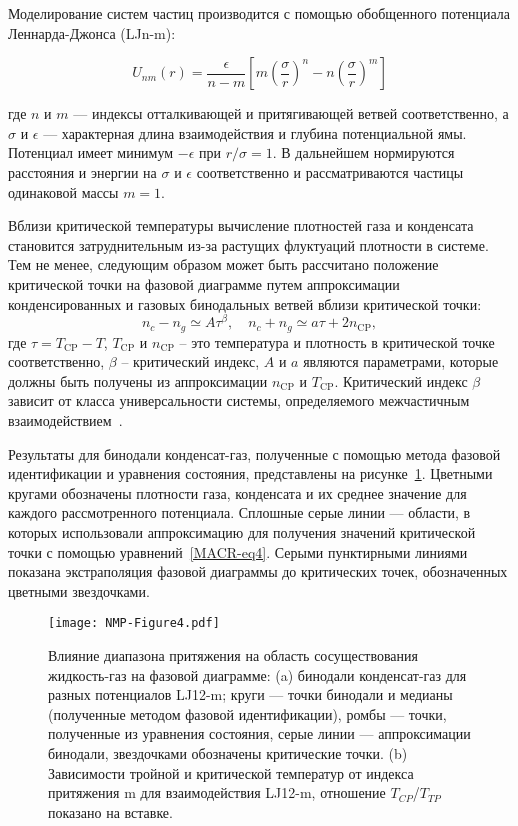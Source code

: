 Моделирование систем частиц производится с помощью обобщенного потенциала Леннарда-Джонса (LJn-m):

\begin{equation}
	U_{n m}(r)=\frac{\epsilon}{n-m}\left[m\left(\frac{\sigma}{r}\right)^{n}-n\left(\frac{\sigma}{r}\right)^{m}\right]
	\label{LJnm}
\end{equation}

где $n$ и $m$ — индексы отталкивающей и притягивающей ветвей соответственно, а $\sigma$ и $\epsilon$ — характерная длина взаимодействия и глубина потенциальной ямы.
Потенциал имеет минимум $-\epsilon$ при $r/\sigma=1$.
В дальнейшем нормируются расстояния и энергии на $\sigma$ и $\epsilon$ соответственно и рассматриваются частицы одинаковой массы $m=1$.

Вблизи критической температуры вычисление плотностей газа и конденсата становится затруднительным из-за растущих флуктуаций плотности в системе.
Тем не менее, следующим образом может быть рассчитано положение критической точки на фазовой диаграмме путем аппроксимации конденсированных и газовых бинодальных ветвей вблизи критической точки:
\begin{equation}
	n_{c}-n_{g} \simeq A \tau^{\beta}, \quad n_{c}+n_{g} \simeq a \tau+2 n_{\mathrm{CP}},
	\label{MACR-eq4}
\end{equation}
где $\tau=T_{\mathrm{CP}}-T$, $T_{\mathrm{CP}}$ и $n_{\mathrm{CP}}$ -- это температура и 
плотность в критической точке соответственно, $\beta$ -- критический индекс, $A$ и $a$ являются параметрами, которые должны быть получены из аппроксимации $n_{\mathrm{CP}}$ и $T_{\mathrm{CP}}$.
Критический индекс $\beta$ зависит от класса универсальности системы, определяемого межчастичным взаимодействием~\cite{10.1103/physrevlett.89.025703}.

Результаты для бинодали конденсат-газ, полученные с помощью метода фазовой идентификации и уравнения состояния, представлены на рисунке~\ref{nmp}.
Цветными кругами обозначены плотности газа, конденсата и их среднее значение для каждого рассмотренного потенциала. 
Сплошные серые линии — области, в которых использовали аппроксимацию для получения значений критической точки с помощью уравнений~\ref{MACR-eq4}. 
Серыми пунктирными линиями показана экстраполяция фазовой диаграммы до критических точек, обозначенных цветными звездочками.

\begin{figure}[!h]
	\begin{center}
		\texttt{[image: NMP-Figure4.pdf]}
		\caption{Влияние диапазона притяжения на область сосуществования жидкость-газ на фазовой диаграмме: (a) бинодали конденсат-газ для разных потенциалов LJ12-m; круги — точки бинодали и медианы (полученные методом фазовой идентификации), ромбы — точки, полученные из уравнения состояния, серые линии — аппроксимации бинодали, звездочками обозначены критические точки.
			(b) Зависимости тройной и критической температур от индекса притяжения m для взаимодействия LJ12-m, отношение $T_{CP}$/$T_{TP}$ показано на вставке.}
		\label{nmp}
	\end{center}
\end{figure}

